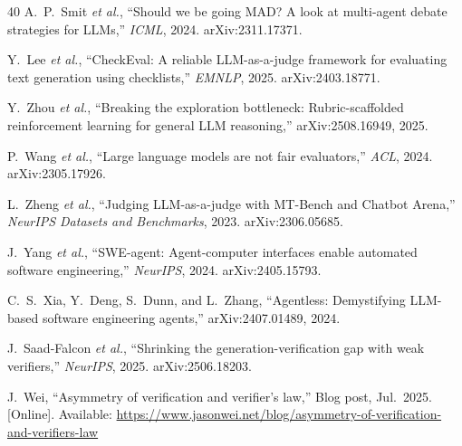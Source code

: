 \documentclass[journal]{IEEEtran}
\begin{document}
\begin{thebibliography}{40}
 A.~P.~Smit \emph{et al.}, ``Should we be going MAD? A
look at multi-agent debate strategies for LLMs,'' \emph{ICML}, 2024.
arXiv:2311.17371.

 Y.~Lee \emph{et al.}, ``CheckEval: A reliable
LLM-as-a-judge framework for evaluating text generation using checklists,''
\emph{EMNLP}, 2025. arXiv:2403.18771.

 Y.~Zhou \emph{et al.}, ``Breaking the exploration
bottleneck: Rubric-scaffolded reinforcement learning for general LLM
reasoning,'' arXiv:2508.16949, 2025.

 P.~Wang \emph{et al.}, ``Large language models are
not fair evaluators,'' \emph{ACL}, 2024. arXiv:2305.17926.

 L.~Zheng \emph{et al.}, ``Judging LLM-as-a-judge with
MT-Bench and Chatbot Arena,'' \emph{NeurIPS Datasets and Benchmarks}, 2023.
arXiv:2306.05685.

 J.~Yang \emph{et al.}, ``SWE-agent:
Agent-computer interfaces enable automated software engineering,''
\emph{NeurIPS}, 2024. arXiv:2405.15793.

 C.~S.~Xia, Y.~Deng, S.~Dunn, and L.~Zhang,
``Agentless: Demystifying LLM-based software engineering agents,''
arXiv:2407.01489, 2024.

 J.~Saad-Falcon \emph{et al.}, ``Shrinking the
generation-verification gap with weak verifiers,'' \emph{NeurIPS}, 2025.
arXiv:2506.18203.

 J.~Wei, ``Asymmetry of verification and verifier's
law,'' Blog post, Jul.\ 2025. [Online]. Available:
\url{https://www.jasonwei.net/blog/asymmetry-of-verification-and-verifiers-law}

\end{thebibliography}
\end{document}
